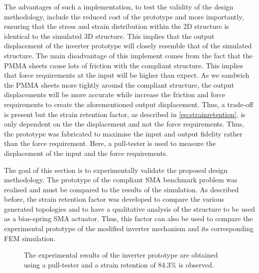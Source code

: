 The advantages of such a implementation, to test the validity of the design methodology, include the reduced cost of the prototype and more importantly, ensuring that the stress and strain distribution within the 2D structure is identical to the simulated 3D structure. This implies that the output displacement of the inverter prototype will closely resemble that of the simulated structure. The main disadvantage of this implement comes from the fact that the PMMA sheets cause lots of friction with the compliant structure. This implies that force requirements at the input will be higher than expect. As we sandwich the PMMA sheets more tightly around the compliant structure, the output displacements will be more accurate while increase the friction and force requirements to create the aforementioned output displacement. Thus, a trade-off is present but the strain retention factor, as described in \cref{eq:strainretention}, is only dependent on the the displacement and not the force requirements. Thus, the prototype was fabricated to maximise the input and output fidelity rather than the force requirement. Here, a pull-tester is used to measure the displacement of the input and the force requirements.

The goal of this section is to experimentally validate the proposed design methodology. The prototype of the compliant SMA benchmark problem was realised and must be compared to the results of the simulation. As described before, the strain retention factor was developed to compare the various generated topologies and to have a qualitative analysis of the structure to be used as a bias-spring SMA actuator. Thus, this factor can also be used to compare the experimental prototype of the modified inverter mechanism and its corresponding FEM simulation.

\begin{figure}[hbt!]
    \centering
    \resizebox{0.7\textwidth}{!}{}
    \caption{The experimental results of the inverter prototype are obtained using a pull-tester and a strain retention of 84.3\% is observed.}
    \label{fig:results-proto-inverter}
\end{figure}%

